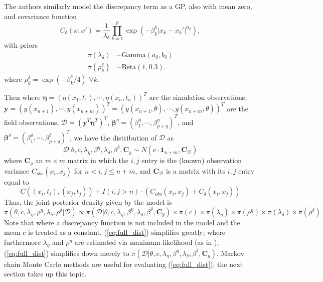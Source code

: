 \documentclass{article}
\begin{document}
The authors similarly model the discrepancy term as a GP, also with mean zero, and covariance function
\begin{equation}
C_\delta(x,x') = \frac 1{\lambda_\delta} \prod_{k=1}^p
\exp\left( -\beta_k^\delta |x_k-x_k'|^{\alpha_\delta} \right),
\end{equation}
with priors
\begin{align}
\pi(\lambda_\delta) &\sim \mathrm{Gamma}(a_\delta,b_\delta)\\
\pi(\rho^\delta_k) &\sim \mathrm{Beta}(1,0.3).
\end{align}
where $\rho_k^\delta=\exp(-\beta_k^\delta/4)$ $\forall k$.

Then where $\boldsymbol \eta = (\eta(x_1,t_1),\cdots,\eta(x_n,t_n))^T$ are the simulation observations, $\mathbf y = (y(x_{n+1}),\cdots,y(x_{n+m}))^T= (y(x_{n+1},\theta),\cdots,y(x_{n+m},\theta))^T$ are the field observations, $\mathcal D = (\mathbf y^T \boldsymbol \eta^T)^T$, $\boldsymbol \beta^\eta = (\beta^\eta_1,\cdots,\beta_{p+q}^\eta)^T$, and $\boldsymbol \beta^\delta = (\beta^\delta_1,\cdots,\beta_{p+q}^\delta)^T$, we have the distribution of $\mathcal D$ as
\begin{equation}
\mathcal D | \theta,c,\lambda_\eta, \beta^\eta,\lambda_\delta,\beta^\delta,\mathbf C_y \sim N(c \cdot \mathbf 1_{n+m}, \mathbf C_{\mathcal D})
\end{equation}
where $\mathbf C_y$ an $m\times m$ matrix in which the $i,j$ entry is the (known) observation variance $C_{obs}(x_i,x_j)$ for $n<i,j\leq n+m$, and $\mathbf C_{\mathcal D}$ is a matrix with its $i,j$ entry equal to
\begin{equation}
C((x_i,t_i),(x_j,t_j)) + I(i,j>n)\cdot(C_{obs}(x_i,x_j) + C_\delta(x_i,x_j))
\end{equation}
Thus, the joint posterior density given by the model is
\begin{equation} \label{eq:full_dist}
\pi(\theta,c,\lambda_\eta,\rho^\eta,\lambda_\delta,\rho^\delta|\mathcal D)
\propto \pi(\mathcal D | \theta,c,\lambda_\eta, \beta^\eta,\lambda_\delta,\beta^\delta,\mathbf C_y) \times \pi(c) \times \pi(\lambda_\eta) \times 
\pi(\rho^\eta) \times \pi(\lambda_\delta) \times \pi(\rho^\delta)
\end{equation}
Note that where a discrepancy function is not included in the model and the mean $c$ is treated as a constant, (\ref{eq:full_dist}) simplifies greatly; where furthermore $\lambda_\eta$ and $\rho^\eta$ are estimated via maximum likelihood (as in  \cite{Kennedy2001}),  (\ref{eq:full_dist}) simplifies down merely to 
$\pi(\mathcal D | \theta,c,\lambda_\eta, \beta^\eta,\lambda_\delta,\beta^\delta,\mathbf C_y)$. Markov chain Monte Carlo methods are useful for evaluating (\ref{eq:full_dist}); the next section takes up this topic.
\end{document}
